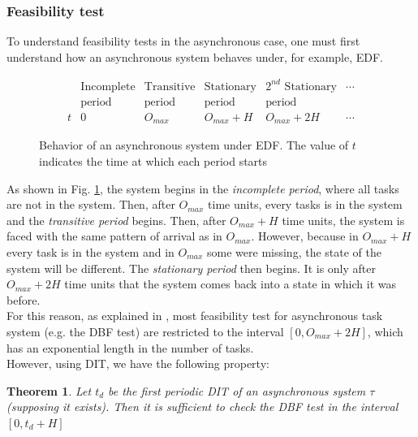 \documentclass[a4paper,10pt]{article}
\newtheorem{theorem}{Theorem}
\begin{document}
\subsubsection{Feasibility test}

To understand feasibility tests in the asynchronous case, one must first understand how an asynchronous system behaves under, for example, EDF.\\

\begin{figure}[h]
$$
\begin{array}{r|c|c|c|c|l}
	 & \text{Incomplete} & \text{Transitive} & \text{Stationary} & \text{$2^{nd}$ Stationary} & \cdots \\
	 & \text{period} & \text{period} & \text{period} & \text{period} & \\
	\hline
	t & 0 & O_{max} & O_{max} + H & O_{max} + 2H & \cdots
\end{array}
$$
\begin{center}
\caption{Behavior of an asynchronous system under EDF. The value of $t$ indicates the time at which each period starts}
\label{fig:asyncBehavior}
\end{center}
\end{figure}

As shown in Fig. \ref{fig:asyncBehavior}, the system begins in the \emph{incomplete period}, where all tasks are not in the system. Then, after $O_{max}$ time units, every tasks is in the system and the \emph{transitive period} begins. Then, after $O_{max} + H$ time units, the system is faced with the same pattern of arrival as in $O_{max}$. However, because in $O_{max} + H$ every task is in the system and in $O_{max}$ some were missing, the state of the system will be different. The \emph{stationary period} then begins. It is only after $O_{max} + 2H$ time units that the system comes back into a state in which it was before.\\

For this reason, as explained in \cite{leung1982complexity}, most feasibility test for asynchronous task system (e.g. the DBF test) are restricted to the interval $[0, O_{max} + 2H]$, which has an exponential length in the number of tasks.\\

However, using DIT, we have the following property:

\begin{theorem}
Let $t_d$ be the first periodic DIT of an asynchronous system $\tau$ (supposing it exists). Then it is sufficient to check the DBF test in the interval $[0, t_d + H]$
\end{theorem}
\end{document}
